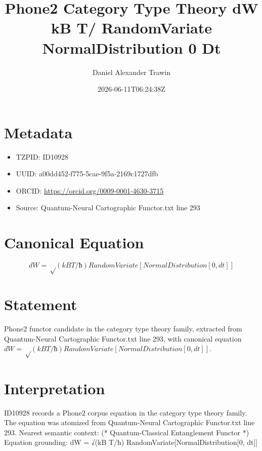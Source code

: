 \documentclass[11pt]{article}
\title{Phone2 Category Type Theory dW kB T/ RandomVariate NormalDistribution 0 Dt}
\author{Daniel Alexander Trawin}
\date{2026-06-11T06:24:38Z}
\begin{document}
\maketitle
\section*{Metadata}
\begin{itemize}
\item TZPID: ID10928
\item UUID: a00dd452-f775-5cae-9f5a-2169c1727dfb
\item ORCID: \url{https://orcid.org/0009-0001-4630-3715}
\item Source: Quantum-Neural Cartographic Functor.txt line 293
\end{itemize}
\section*{Canonical Equation}
\[
dW = √(kB T/ħ) RandomVariate[NormalDistribution[0, dt]]
\]
\section*{Statement}
Phone2 functor candidate in the category type theory family, extracted from Quantum-Neural Cartographic Functor.txt line 293, with canonical equation $dW = √(kB T/ħ) RandomVariate[NormalDistribution[0, dt]]$.
\section*{Interpretation}
ID10928 records a Phone2 corpus equation in the category type theory family. The equation was atomized from Quantum-Neural Cartographic Functor.txt line 293. Nearest semantic context: (* Quantum-Classical Entanglement Functor *) Equation grounding: dW = √(kB T/ħ) RandomVariate[NormalDistribution[0, dt]]
\end{document}
